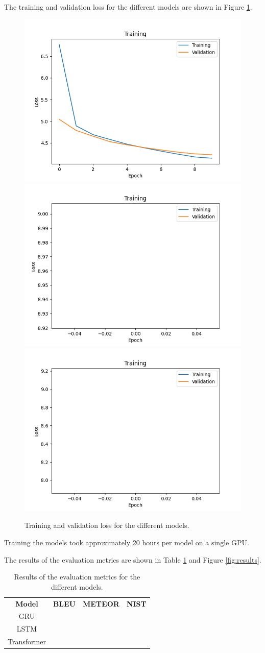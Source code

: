 \documentclass[12pt]{article}
\theoremstyle{plain}
\theoremstyle{definition}
\theoremstyle{remark}
\begin{document}
The training and validation loss for the different models are shown in Figure \ref{fig:loss}.
\begin{figure}[H]
    \centering
    \includegraphics[width=.3\textwidth]{res/training-model-gru.png}
    \includegraphics[width=.3\textwidth]{res/training-model-lstm.png}
    \includegraphics[width=.3\textwidth]{res/training-model-transformer.png}
    \caption{Training and validation loss for the different models.}\label{fig:loss}
\end{figure}
Training the models took approximately 20 hours per model on a single GPU.

The results of the evaluation metrics are shown in Table \ref{tab:results} and Figure \ref{fig:results}.
\begin{table}[H]
    \center
    \begin{tabular}{c|c|c|c}
        \textbf{Model} & \textbf{BLEU} & \textbf{METEOR} & \textbf{NIST} \\
        GRU &&& \\
        LSTM &&& \\
        Transformer &&&
    \end{tabular}
    \caption{Results of the evaluation metrics for the different models.}\label{tab:results}
\end{table}
\end{document}
